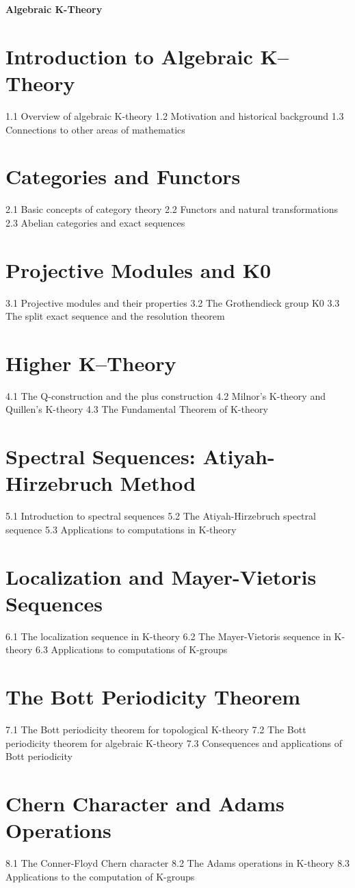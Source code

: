 {\LARGE \bf{Algebraic K-Theory}}
\section{ Introduction to Algebraic K–Theory}
1.1 Overview of algebraic K-theory
1.2 Motivation and historical background
1.3 Connections to other areas of mathematics
\section{Categories and Functors}
2.1 Basic concepts of category theory
2.2 Functors and natural transformations
2.3 Abelian categories and exact sequences
\section{Projective Modules and K0}
3.1 Projective modules and their properties
3.2 The Grothendieck group K0
3.3 The split exact sequence and the resolution theorem
\section{Higher K–Theory}
4.1 The Q-construction and the plus construction
4.2 Milnor's K-theory and Quillen's K-theory
4.3 The Fundamental Theorem of K-theory
\section{Spectral Sequences: Atiyah-Hirzebruch Method}
5.1 Introduction to spectral sequences
5.2 The Atiyah-Hirzebruch spectral sequence
5.3 Applications to computations in K-theory
\section{Localization and Mayer-Vietoris Sequences}
6.1 The localization sequence in K-theory
6.2 The Mayer-Vietoris sequence in K-theory
6.3 Applications to computations of K-groups
\section{The Bott Periodicity Theorem}
7.1 The Bott periodicity theorem for topological K-theory
7.2 The Bott periodicity theorem for algebraic K-theory
7.3 Consequences and applications of Bott periodicity
\section{Chern Character and Adams Operations}
8.1 The Conner-Floyd Chern character
8.2 The Adams operations in K-theory
8.3 Applications to the computation of K-groups
